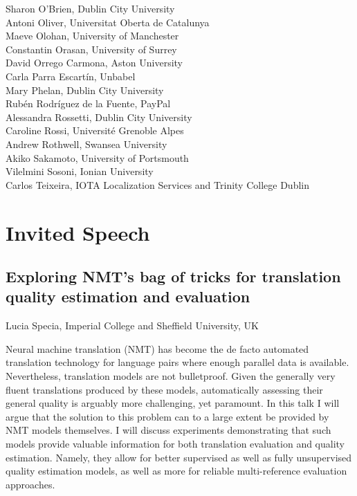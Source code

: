 \documentclass[a4paper,11pt,twoside]{book}
\newcommand{\newoddpage} {\clearpage
  \ifthenelse{\isodd{\value{page}}}{}
  {\thispagestyle{empty}\quad\newpage}}
\begin{document}
\noindent Sharon O'Brien, Dublin City University\\
\noindent Antoni Oliver, Universitat Oberta de Catalunya\\
\noindent Maeve	Olohan, University of Manchester\\
\noindent Constantin Orasan, University of Surrey\\
\noindent David Orrego Carmona, Aston University\\
\noindent Carla Parra Escartín, Unbabel\\
\noindent Mary Phelan, Dublin City University\\
\noindent Rubén Rodríguez de la Fuente, PayPal\\
\noindent Alessandra Rossetti, Dublin City University\\
\noindent Caroline Rossi, Université Grenoble Alpes\\
\noindent Andrew Rothwell, Swansea University\\
\noindent Akiko Sakamoto, University of Portsmouth\\
\noindent Vilelmini Sosoni, Ionian University\\
\noindent Carlos Teixeira, IOTA Localization Services and Trinity College Dublin


\newoddpage
\mainmatter

\chapter*{Invited Speech}

\section*{Exploring NMT's bag of tricks for translation quality estimation and evaluation}\label{invited}
Lucia Specia, Imperial College and Sheffield University, UK
\vspace{0.5cm}

Neural machine translation (NMT) has become the de facto automated translation technology for language pairs where enough parallel data is available. Nevertheless, translation models are not bulletproof. Given the generally very fluent translations produced by these models, automatically assessing their general quality is arguably more challenging, yet paramount. In this talk I will argue that the solution to this problem can to a large extent be provided by NMT models themselves. I will discuss experiments demonstrating that such models provide valuable information for both translation evaluation and quality estimation. Namely, they allow for better supervised as well as fully unsupervised quality estimation models, as well as more for reliable multi-reference evaluation approaches.
\end{document}
